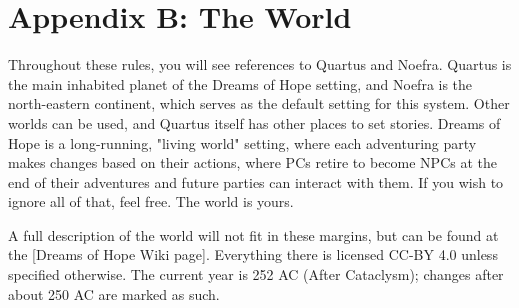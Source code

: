 \chapter{Appendix B: The World} \label{ch:the-world}
Throughout these rules, you will see references to Quartus and Noefra. Quartus is the main inhabited planet of the Dreams of Hope setting, and Noefra is the north-eastern continent, which serves as the default setting for this system. Other worlds can be used, and Quartus itself has other places to set stories. Dreams of Hope is a long-running, "living world" setting, where each adventuring party makes changes based on their actions, where PCs retire to become NPCs at the end of their adventures and future parties can interact with them. If you wish to ignore all of that, feel free. The world is yours.

A full description of the world will not fit in these margins, but can be found at the \href{https://wiki.admiralbenbo.org}[Dreams of Hope Wiki page]. Everything there is licensed CC-BY 4.0 unless specified otherwise. The current year is 252 AC (After Cataclysm); changes after about 250 AC are marked as such.

